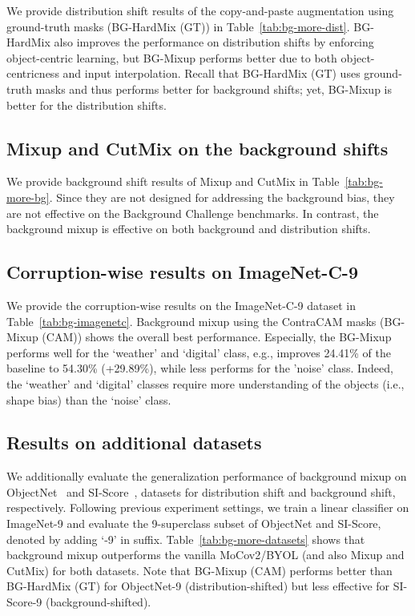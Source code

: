 We provide distribution shift results of the copy-and-paste augmentation using ground-truth masks (BG-HardMix (GT)) in Table~\ref{tab:bg-more-dist}. BG-HardMix also improves the performance on distribution shifts by enforcing object-centric learning, but BG-Mixup performs better due to both object-centricness and input interpolation. Recall that BG-HardMix (GT) uses ground-truth masks and thus performs better for background shifts; yet, BG-Mixup is better for the distribution shifts.




\subsection{Mixup and CutMix on the background shifts}
\label{sec:add-bg-mixup}

We provide background shift results of Mixup and CutMix in Table~\ref{tab:bg-more-bg}. Since they are not designed for addressing the background bias, they are not effective on the Background Challenge benchmarks. In contrast, the background mixup is effective on both background and distribution shifts.




\subsection{Corruption-wise results on ImageNet-C-9}
\label{sec:add-bg-imagenetc}

We provide the corruption-wise results on the ImageNet-C-9 dataset in Table~\ref{tab:bg-imagenetc}. Background mixup using the ContraCAM masks (BG-Mixup (CAM)) shows the overall best performance. Especially, the BG-Mixup performs well for the `weather' and `digital' class, e.g., improves 24.41\% of the baseline to 54.30\% (+29.89\%), while less performs for the 'noise' class. Indeed, the `weather' and `digital' classes require more understanding of the objects (i.e., shape bias) than the `noise' class.

\clearpage



\clearpage
\subsection{Results on additional datasets}
\label{sec:add-bg-datasets}

We additionally evaluate the generalization performance of background mixup on ObjectNet~\citep{barbu2019objectnet} and SI-Score~\citep{djolonga2021robustness}, datasets for distribution shift and background shift, respectively. Following previous experiment settings, we train a linear classifier on ImageNet-9 and evaluate the 9-superclass subset of ObjectNet and SI-Score, denoted by adding `-9' in suffix. Table~\ref{tab:bg-more-datasets} shows that background mixup outperforms the vanilla MoCov2/BYOL (and also Mixup and CutMix) for both datasets.  Note that BG-Mixup (CAM) performs better than BG-HardMix (GT) for ObjectNet-9 (distribution-shifted) but less effective for SI-Score-9 (background-shifted).




